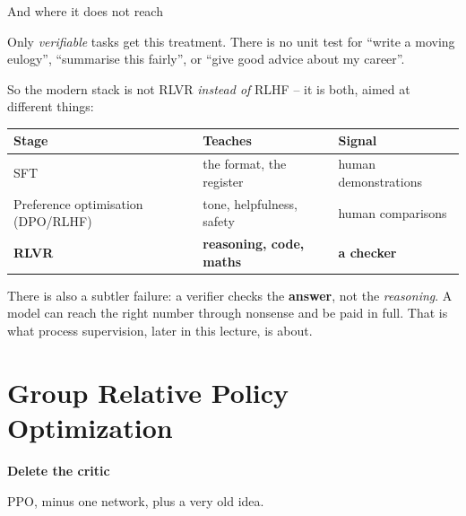\documentclass[aspectratio=169]{beamer}
\begin{document}
\begin{frame}{And where it does not reach}
  \begin{tcolorbox}[colback=armred!8, colframe=armred, boxrule=0.7pt, arc=2pt,
                    title={\textbf{The catch is in the name}}]
    \small
    Only \emph{verifiable} tasks get this treatment. There is no unit test for ``write a moving
    eulogy'', ``summarise this fairly'', or ``give good advice about my career''.
  \end{tcolorbox}

  \vskip 8pt
  \small
  So the modern stack is not RLVR \emph{instead of} RLHF -- it is both, aimed at different
  things:

  \vskip 4pt
  \begin{center}
  \footnotesize
  \begin{tabular}{l l l}
    \toprule
    \textbf{Stage} & \textbf{Teaches} & \textbf{Signal} \\
    \midrule
    SFT & the format, the register & human demonstrations \\
    Preference optimisation (DPO/RLHF) & tone, helpfulness, safety & human comparisons \\
    \textbf{RLVR} & \textbf{reasoning, code, maths} & \textbf{a checker} \\
    \bottomrule
  \end{tabular}
  \end{center}

  \vskip 8pt
  \begin{tcolorbox}[colback=armorange!12, colframe=armorange, boxrule=0.6pt, arc=2pt]
    \small
    There is also a subtler failure: a verifier checks the \textbf{answer}, not the
    \emph{reasoning}. A model can reach the right number through nonsense and be paid in full.
    That is what process supervision, later in this lecture, is about.
  \end{tcolorbox}
\end{frame}

\section{Group Relative Policy Optimization}
\begin{frame}[plain]
  \begin{center}
    \vskip 1.6cm
    {\Huge\bfseries\color{popblue}Delete the critic}

    \vskip 0.6cm
    {\large PPO, minus one network, plus a very old idea.}
  \end{center}
\end{frame}
\end{document}
